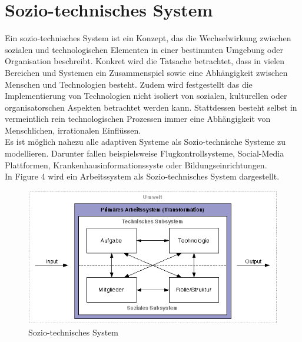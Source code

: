 \documentclass[journal=tosc,final]{iacrtrans}
\begin{document}
\section{Sozio-technisches System}
Ein sozio-technisches System ist ein Konzept, das die Wechselwirkung zwischen sozialen und technologischen Elementen in einer bestimmten Umgebung oder Organisation beschreibt. Konkret wird die Tatsache betrachtet, dass in vielen Bereichen und Systemen ein Zusammenspiel sowie eine Abhängigkeit zwischen Menschen und Technologien besteht. Zudem wird festgestellt das die Implementierung von Technologien nicht isoliert von sozialen, kulturellen oder organisatorschen Aspekten betrachtet werden kann. Stattdessen besteht selbst in vermeintlich rein technologischen Prozessen immer eine Abhängigkeit von Menschlichen, irrationalen Einflüssen.\\
Es ist möglich nahezu alle adaptiven Systeme als Sozio-technische Systeme zu modellieren. Darunter fallen beispielsweise Flugkontrollsysteme, Social-Media Plattformen, Krankenhausinformationssyste oder Bildungseinrichtungen.\\
In Figure 4 wird ein Arbeitssystem als Sozio-technisches System dargestellt.
\begin{figure}[h]
\caption{Sozio-technisches System}
\begin{center}
 \includegraphics[scale=0.5]{sozio.png}
\end{center}
\end{figure}
\end{document}
